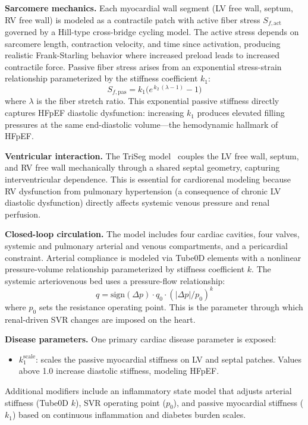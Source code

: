 \documentclass[pmlr]{jmlr}
\begin{document}
\textbf{Sarcomere mechanics.} Each myocardial wall segment (LV free wall, septum, RV free wall) is modeled as a contractile patch with active fiber stress $S_{f,\text{act}}$ governed by a Hill-type cross-bridge cycling model. The active stress depends on sarcomere length, contraction velocity, and time since activation, producing realistic Frank-Starling behavior where increased preload leads to increased contractile force. Passive fiber stress arises from an exponential stress-strain relationship parameterized by the stiffness coefficient $k_1$:
\begin{equation}
S_{f,\text{pas}} = k_1 \bigl(e^{\,k_2\,(\lambda - 1)} - 1\bigr)
\label{eq:passive}
\end{equation}
where $\lambda$ is the fiber stretch ratio. This exponential passive stiffness directly captures HFpEF diastolic dysfunction: increasing $k_1$ produces elevated filling pressures at the same end-diastolic volume---the hemodynamic hallmark of HFpEF.

\textbf{Ventricular interaction.} The TriSeg model~\citep{lumens2009} couples the LV free wall, septum, and RV free wall mechanically through a shared septal geometry, capturing interventricular dependence. This is essential for cardiorenal modeling because RV dysfunction from pulmonary hypertension (a consequence of chronic LV diastolic dysfunction) directly affects systemic venous pressure and renal perfusion.

\textbf{Closed-loop circulation.} The model includes four cardiac cavities, four valves, systemic and pulmonary arterial and venous compartments, and a pericardial constraint. Arterial compliance is modeled via Tube0D elements with a nonlinear pressure-volume relationship parameterized by stiffness coefficient $k$. The systemic arteriovenous bed uses a pressure-flow relationship:
\begin{equation}
q = \text{sign}(\Delta p) \cdot q_0 \cdot (|\Delta p| / p_0)^k
\label{eq:artven}
\end{equation}
where $p_0$ sets the resistance operating point. This is the parameter through which renal-driven SVR changes are imposed on the heart.

\textbf{Disease parameters.} One primary cardiac disease parameter is exposed:
\begin{itemize}
\item $k_1^{\text{scale}}$: scales the passive myocardial stiffness on LV and septal patches. Values above 1.0 increase diastolic stiffness, modeling HFpEF.
\end{itemize}
Additional modifiers include an inflammatory state model that adjusts arterial stiffness (Tube0D $k$), SVR operating point ($p_0$), and passive myocardial stiffness ($k_1$) based on continuous inflammation and diabetes burden scales.
\end{document}
